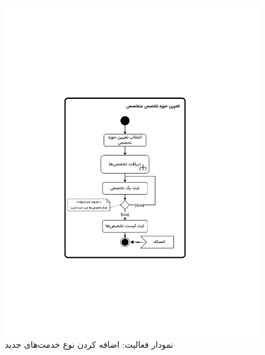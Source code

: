 \begin{figure}
	\centering
	\includegraphics[scale=0.8, page=2]{figs/OOD-activity21-30.pdf}
	\caption{نمودار فعالیت: اضافه کردن نوع خدمت‌های جدید}
\end{figure}
\FloatBarrier
\newpage

